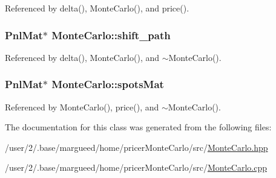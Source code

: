 Referenced by delta(), Monte\-Carlo(), and price().

\hypertarget{classMonteCarlo_a07755948492ef0832d5e131c1f010565}{
\subsubsection[{shift\-\_\-path}]{\setlength{\rightskip}{0pt plus 5cm}Pnl\-Mat$\ast$ Monte\-Carlo\-::shift\-\_\-path\hspace{0.3cm}{\ttfamily [private]}}}\label{classMonteCarlo_a07755948492ef0832d5e131c1f010565}


Referenced by delta(), Monte\-Carlo(), and $\sim$\-Monte\-Carlo().

\hypertarget{classMonteCarlo_a713c3dd7942f90fde1b0d9d115733580}{
\subsubsection[{spots\-Mat}]{\setlength{\rightskip}{0pt plus 5cm}Pnl\-Mat$\ast$ Monte\-Carlo\-::spots\-Mat\hspace{0.3cm}{\ttfamily [private]}}}\label{classMonteCarlo_a713c3dd7942f90fde1b0d9d115733580}


Referenced by Monte\-Carlo(), price(), and $\sim$\-Monte\-Carlo().



The documentation for this class was generated from the following files\-:\begin{DoxyCompactItemize}
\item 
/user/2/.\-base/margueed/home/pricer\-Monte\-Carlo/src/\hyperlink{MonteCarlo_8hpp}{Monte\-Carlo.\-hpp}\item 
/user/2/.\-base/margueed/home/pricer\-Monte\-Carlo/src/\hyperlink{MonteCarlo_8cpp}{Monte\-Carlo.\-cpp}\end{DoxyCompactItemize}

